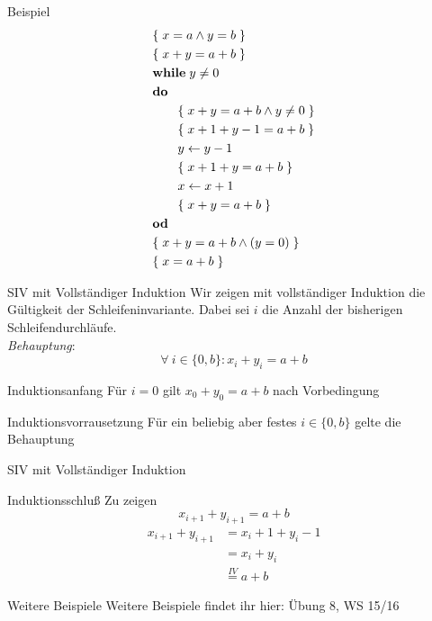 \begin{frame}{Beispiel}
	\vspace{-5mm}
	\begin{align*}
		&\{\;x=a \land y=b \;\}  \\
		&\{\;x+y=a+b \;\}  \\
		&\mathbf{while } \; y\not=0  \\
		&\mathbf{do } \\
		&\qquad\{\;x+y=a+b \land y\not=0 \;\}  \\
		&\qquad\{\;x+1+y-1=a+b \;\} \\
		&\qquad y \gets y-1 \\
		&\qquad\{\;x+1+y = a+b\;\} \\
		&\qquad x \gets x+1 \\
		&\qquad\{\;x+y = a+b\;\} \\
		&\mathbf{od } \\
		&\{\;x+y = a+b \land (y=0) \;\} \\
		&\{\;x=a+b\;\} \\
	\end{align*}
\end{frame}

\begin{frame}{SIV mit Vollständiger Induktion}
	Wir zeigen mit vollständiger Induktion die Gültigkeit der Schleifeninvariante. Dabei sei $i$ die Anzahl der bisherigen Schleifendurchläufe.\\
	
	\emph{Behauptung}: $$ \forall\ i \in \{0,b\} : x_i + y_i = a+b $$ \pause
	\begin{block}{Induktionsanfang}
		Für $i=0$ gilt $ x_0+y_0 = a+b $ nach Vorbedingung
	\end{block} \pause 
	\begin{block}{Induktionsvorrausetzung}
		Für ein beliebig aber festes $i\in \{0,b\}$ gelte die Behauptung
	\end{block}
\end{frame}

\begin{frame}{SIV mit Vollständiger Induktion}
	\begin{block}{Induktionsschluß}
		Zu zeigen $$ x_{i+1} + y_{i+1} = a+b $$ \pause
		\begin{align*}
		x_{i+1}+y_{i+1} &= x_i +1 + y_i -1 \\
		&= x_i + y_i \\
		&\overset{IV}{=} a+b
		\end{align*}
	\end{block}
\end{frame}

\begin{frame} {Weitere Beispiele}
	Weitere Beispiele findet ihr hier: Übung 8, WS 15/16
\end{frame}